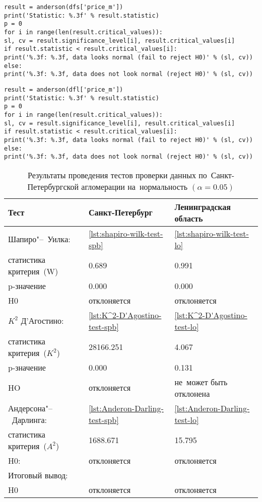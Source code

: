 \documentclass[]{scrartcl}
\begin{document}
%
\begin{lstlisting}[float, caption = Тест Андерсона-Дарлинга для~данных по~Санкт-Петербургу, firstnumber=1, label= lst:Anderon-Darling-test-spb]
result = anderson(dfs['price_m'])
print('Statistic: %.3f' % result.statistic)
p = 0
for i in range(len(result.critical_values)):
sl, cv = result.significance_level[i], result.critical_values[i]
if result.statistic < result.critical_values[i]:
print('%.3f: %.3f, data looks normal (fail to reject H0)' % (sl, cv))
else:
print('%.3f: %.3f, data does not look normal (reject H0)' % (sl, cv))
\end{lstlisting}
%
\begin{lstlisting}[float, caption = Тест Андерсона-Дарлинга для~данных по~Ленинградской области, firstnumber=1, label= lst:Anderon-Darling-test-lo]
result = anderson(dfl['price_m'])
print('Statistic: %.3f' % result.statistic)
p = 0
for i in range(len(result.critical_values)):
sl, cv = result.significance_level[i], result.critical_values[i]
if result.statistic < result.critical_values[i]:
print('%.3f: %.3f, data looks normal (fail to reject H0)' % (sl, cv))
else:
print('%.3f: %.3f, data does not look normal (reject H0)' % (sl, cv))
\end{lstlisting}  
%
\begin{table}[ht]
	\caption{Результаты проведения тестов проверки данных по~Санкт-Петербургской агломерации на~нормальность $({\textstyle \alpha=0.05})$}\label{tab:normality-tests-values}
	\centering
	\begin{tabular}{lll}
		\hline
		Тест&Санкт-Петербург&Ленинградская область\\
		\hline
		Шапиро"--~Уилка:&\ref{lst:shapiro-wilk-test-spb}&\ref{lst:shapiro-wilk-test-lo}\\
		статистика критерия~(W)&0.689&0.991\\
		p-значение&0.000&0.000\\
		H0&отклоняется&отклоняется\\
		\hline
		${\textstyle K^{2}}$ Д'Агостино:&\ref{lst:K^2-D'Agostino-test-spb}&\ref{lst:K^2-D'Agostino-test-lo}\\
		статистика критерия~(${\textstyle K^{2}}$)&28166.251&4.067\\
		p-значение&0.000&0.131\\
		HO&отклоняется&не~может быть отклонена\\
		\hline
		Андерсона"--~Дарлинга:&\ref{lst:Anderon-Darling-test-spb}&\ref{lst:Anderon-Darling-test-lo}\\
		статистика критерия~(${\textstyle A^{2}}$)&1688.671&15.795\\
		H0:&отклоняется&отклоняется\\
		\hline
		Итоговый вывод:&&\\
		H0&отклоняется&отклоняется\\
		\hline
	\end{tabular}
\end{table}
\end{document}
